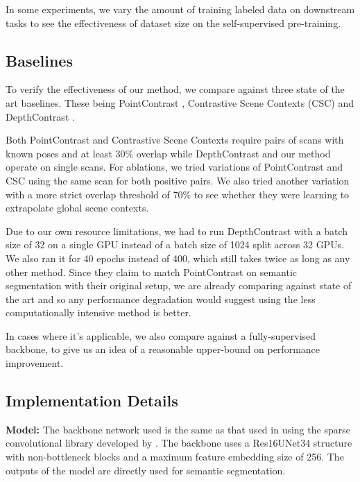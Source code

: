 \documentclass[10pt,twocolumn,letterpaper]{article}
\begin{document}
In some experiments, we vary the amount of training labeled data on downstream tasks to see the effectiveness of dataset size on the self-supervised pre-training.

\subsection{Baselines}
\label{sec:results:baselines}

To verify the effectiveness of our method, we compare against three state of the art baselines. These being PointContrast \cite{xie2020pointcontrast}, Contrastive Scene Contexts (CSC) \cite{hou2021Exploring} and DepthContrast \cite{zhang2021Self}.

Both PointContrast and Contrastive Scene Contexts require pairs of scans with known poses and at least 30\% overlap while DepthContrast and our method operate on single scans. For ablations, we tried variations of PointContrast and CSC using the same scan for both positive pairs. We also tried another variation with a more strict overlap threshold of 70\% to see whether they were learning to extrapolate global scene contexts.

Due to our own resource limitations, we had to run DepthContrast with a batch size of 32 on a single GPU instead of a batch size of 1024 split across 32 GPUs. We also ran it for 40 epochs instead of 400, which still takes twice as long as any other method. Since they claim to match PointContrast on semantic segmentation with their original setup, we are already comparing against state of the art and so any performance degradation would suggest using the less computationally intensive method is better.

In cases where it's applicable, we also compare against a fully-supervised backbone, to give us an idea of a reasonable upper-bound on performance improvement.

\subsection{Implementation Details}
\label{sec:results:implementation}

\textbf{Model:} The backbone network used is the same as that used in \cite{xie2020pointcontrast, hou2021Exploring} using the sparse convolutional library developed by \cite{choy20194d}. The backbone uses a Res16UNet34 structure with non-bottleneck blocks and a maximum feature embedding size of 256. The outputs of the model are directly used for semantic segmentation.
\end{document}
